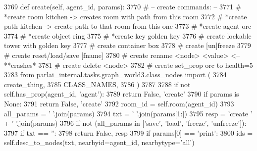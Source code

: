 \begin{DoxyCode}
3769     \textcolor{keyword}{def }create(self, agent\_id, params):
3770         \textcolor{comment}{# -- create commands: --}
3771         \textcolor{comment}{# *create room kitchen  -> creates room with path from this room}
3772         \textcolor{comment}{# *create path kitchen  -> create path to that room from this one}
3773         \textcolor{comment}{# *create agent orc}
3774         \textcolor{comment}{# *create object ring}
3775         \textcolor{comment}{# *create key golden key}
3776         \textcolor{comment}{# create lockable tower with golden key}
3777         \textcolor{comment}{# create container box}
3778         \textcolor{comment}{# create [un]freeze}
3779         \textcolor{comment}{# create reset/load/save [fname]}
3780         \textcolor{comment}{# create rename <node> <value>    <-- **crashes*}
3781         \textcolor{comment}{# create delete <node>}
3782         \textcolor{comment}{# create set\_prop orc to health=5}
3783         \textcolor{keyword}{from} parlai\_internal.tasks.graph\_world3.class\_nodes \textcolor{keyword}{import} (
3784             create\_thing,
3785             CLASS\_NAMES,
3786         )
3787 
3788         \textcolor{keywordflow}{if} \textcolor{keywordflow}{not} self.has\_prop(agent\_id, \textcolor{stringliteral}{'agent'}):
3789             \textcolor{keywordflow}{return} \textcolor{keyword}{False}, \textcolor{stringliteral}{'create'}
3790         \textcolor{keywordflow}{if} params \textcolor{keywordflow}{is} \textcolor{keywordtype}{None}:
3791             \textcolor{keywordflow}{return} \textcolor{keyword}{False}, \textcolor{stringliteral}{'create'}
3792         room\_id = self.room(agent\_id)
3793         all\_params = \textcolor{stringliteral}{' '}.join(params)
3794         txt = \textcolor{stringliteral}{' '}.join(params[1:])
3795         resp = \textcolor{stringliteral}{'create '} + \textcolor{stringliteral}{' '}.join(params)
3796         \textcolor{keywordflow}{if} \textcolor{keywordflow}{not} (all\_params \textcolor{keywordflow}{in} [\textcolor{stringliteral}{'save'}, \textcolor{stringliteral}{'load'}, \textcolor{stringliteral}{'freeze'}, \textcolor{stringliteral}{'unfreeze'}]):
3797             \textcolor{keywordflow}{if} txt == \textcolor{stringliteral}{''}:
3798                 \textcolor{keywordflow}{return} \textcolor{keyword}{False}, resp
3799         \textcolor{keywordflow}{if} params[0] == \textcolor{stringliteral}{'print'}:
3800             ids = self.desc\_to\_nodes(txt, nearbyid=agent\_id, nearbytype=\textcolor{stringliteral}{'all'})

\end{DoxyCode}
